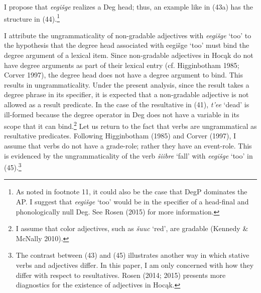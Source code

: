 \documentclass[output=paper]{LSP/langsci}
\begin{document}
\begin{exe}
\ex
\begin{xlist}




\end{xlist}
\end{exe}

I propose that \textit{eegišge} realizes a Deg head; thus, an example like in (43a) has the structure in (44).\footnote{As noted in footnote 11, it could also be the case that DegP dominates the AP. I suggest that \textit{eegišge} `too' would be in the specifier of a head-final and phonologically null Deg. See Rosen (2015) for more information.}

\begin{exe}
\ex 
{\hspace{1em}}\newline
{}
\end{exe}

I attribute the ungrammaticality of non-gradable adjectives with \textit{eegišge} `too' to the hypothesis that the degree head associated with eegišge `too' must bind the degree argument of a lexical item. Since non-gradable adjectives in Hocąk do not have degree arguments as part of their lexical entry (cf. Higginbotham 1985; Corver 1997), the degree head does not have a degree argument to bind. This results in ungrammaticality. Under the present analysis, since the result takes a degree phrase in its specifier, it is expected that a non-gradable adjective is not allowed as a result predicate. In the case of the resultative in (41), \textit{t'ee} `dead' is ill-formed because the degree operator in Deg does not have a variable in its scope that it can bind.\footnote{I assume that color adjectives, such as \textit{šuuc} `red', are gradable (Kennedy \& McNally 2010).} Let us return to the fact that verbs are ungrammatical as resultative predicates. Following Higginbotham (1985) and Corver (1997), I assume that verbs do not have a grade-role; rather they have an event-role. This is evidenced by the ungrammaticality of the verb \textit{šiibre} `fall' with \textit{eegišge} `too' in (45).\footnote{The contrast between (43) and (45) illustrates another way in which stative verbs and adjectives differ. In this paper, I am only concerned with how they differ with respect to resultatives. Rosen (2014; 2015) presents more diagnostics for the existence of adjectives in Hocąk.}
\end{document}
